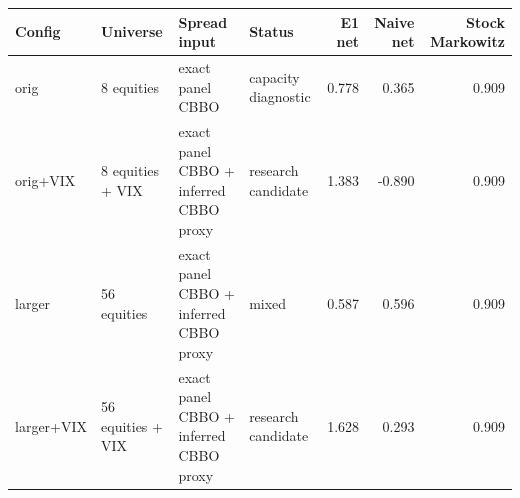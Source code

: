 \begin{tabular}{llllrrr}
\toprule
Config & Universe & Spread input & Status & E1 net & Naive net & Stock Markowitz \\
\midrule
orig & 8 equities & exact panel CBBO & capacity diagnostic & 0.778 & 0.365 & 0.909 \\
orig+VIX & 8 equities + VIX & exact panel CBBO + inferred CBBO proxy & research candidate & 1.383 & -0.890 & 0.909 \\
larger & 56 equities & exact panel CBBO + inferred CBBO proxy & mixed & 0.587 & 0.596 & 0.909 \\
larger+VIX & 56 equities + VIX & exact panel CBBO + inferred CBBO proxy & research candidate & 1.628 & 0.293 & 0.909 \\
\bottomrule
\end{tabular}
